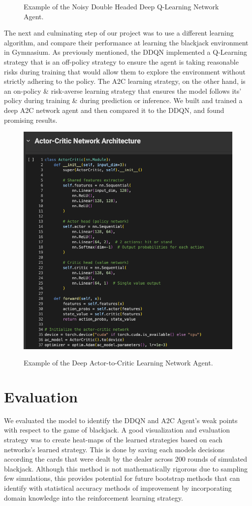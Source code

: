 \documentclass[compsoc]{IEEEtran}
\begin{document}
{\begin{figure}[h]
\caption{Example of the Noisy Double Headed Deep Q-Learning Network Agent.}
\end{figure}
The next and culminating step of our project was to use a different learning algorithm, and compare their performance at learning the blackjack environment in Gymnasium. As previously mentioned, the  DDQN implemented a Q-Learning strategy that is an off-policy strategy to ensure the agent is taking reasonable risks during training that would allow them to explore the environment without strictly adhering to the policy. The A2C learning strategy, on the other hand, is an on-policy \& risk-averse learning strategy that ensures the model follows its' policy during training \& during prediction or inference. We built and trained a deep A2C network agent and then compared it to the DDQN, and found promising results.
\begin{figure}[h]
{\includegraphics[scale=0.28]{./fig/AC2.png}}
\caption{Example of the Deep Actor-to-Critic Learning Network Agent.}
\end{figure}

\section{Evaluation}\label{sec:eval}
We evaluated the model to identify the DDQN and A2C Agent's weak points with respect to the game of blackjack. A good visualization and evaluation strategy was to create heat-maps of the learned strategies based on each networks's learned strategy. This is done by saving each models decisions according the cards that were dealt by the dealer across 200 rounds of simulated blackjack. Although this method is not mathematically rigorous due to sampling few simulations, this provides potential for future bootstrap methods that can identify with statistical accuracy methods of improvement by incorporating domain knowledge into the reinforcement learning strategy.

}
\end{document}
